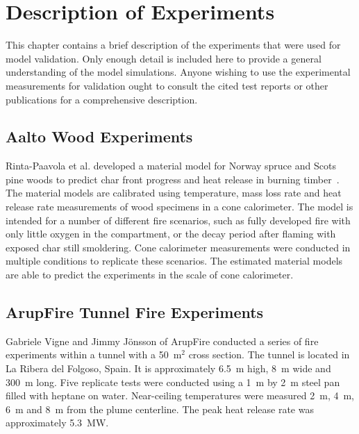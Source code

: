 
\chapter{Description of Experiments}

\label{Experiments_Chapter}

This chapter contains a brief description of the experiments that were used for model validation. Only enough detail is included here to provide a general understanding of the model simulations. Anyone wishing to use the experimental measurements for validation ought to consult the cited test reports or other publications for a comprehensive description.


\section{Aalto Wood Experiments}
\label{Aalto_Woods_Description}

Rinta-Paavola et al. developed a material model for Norway spruce and Scots pine woods to predict char front progress and heat release in burning timber~\cite{Rinta-Paavola:2022}. The material models are calibrated using temperature, mass loss rate and heat release rate measurements of wood specimens in a cone calorimeter. The model is intended for a number of different fire scenarios, such as fully developed fire with only little oxygen in the compartment, or the decay period after flaming with exposed char still smoldering. Cone calorimeter measurements were conducted in multiple conditions to replicate these scenarios. The estimated material models are able to predict the experiments in the scale of cone calorimeter.


\section{ArupFire Tunnel Fire Experiments}
\label{ArupFire_Tunnel_Fire_Description}

Gabriele Vigne and Jimmy J\"{o}nsson of ArupFire conducted a series of fire experiments within a tunnel with a 50~m$^2$ cross section. The tunnel is located in La Ribera del Folgoso, Spain. It is approximately 6.5~m high, 8~m wide and 300~m long. Five replicate tests were conducted using a 1~m by 2~m steel pan filled with heptane on water. Near-ceiling temperatures were measured 2~m, 4~m, 6~m and 8~m from the plume centerline. The peak heat release rate was approximately 5.3~MW.


